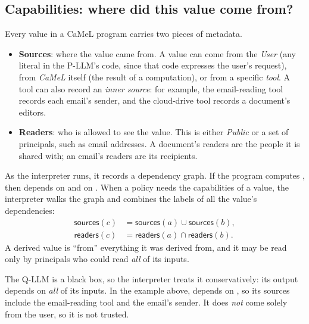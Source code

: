 \subsection{Capabilities: where did this value come from?}
\label{sec:camel:caps}

Every value in a CaMeL program carries two pieces of metadata.
\begin{itemize}
  \item \textbf{Sources}: where the value came from. A value can come
    from the \emph{User} (any literal in the P-LLM's code, since that
    code expresses the user's request), from \emph{CaMeL} itself (the
    result of a computation), or from a specific \emph{tool}. A tool can
    also record an \emph{inner source}: for example, the email-reading
    tool records each email's sender, and the cloud-drive tool records a
    document's editors.
  \item \textbf{Readers}: who is allowed to see the value. This is
    either \emph{Public} or a set of principals, such as email
    addresses. A document's readers are the people it is shared with; an
    email's readers are its recipients.
\end{itemize}

As the interpreter runs, it records a dependency graph.
If the program computes , then  depends on 
and on .
When a policy needs the capabilities of a value, the interpreter walks
the graph and combines the labels of all the value's dependencies:
\begin{align*}
  \mathsf{sources}(c) &= \mathsf{sources}(a) \cup \mathsf{sources}(b),\\
  \mathsf{readers}(c) &= \mathsf{readers}(a) \cap \mathsf{readers}(b).
\end{align*}
A derived value is ``from'' everything it was derived from, and it may
be read only by principals who could read \emph{all} of its inputs.

The Q-LLM is a black box, so the interpreter treats it conservatively:
its output depends on \emph{all} of its inputs.
In the example above,  depends on , so its
sources include the email-reading tool and the email's sender.
It does \emph{not} come solely from the user, so it is not trusted.

